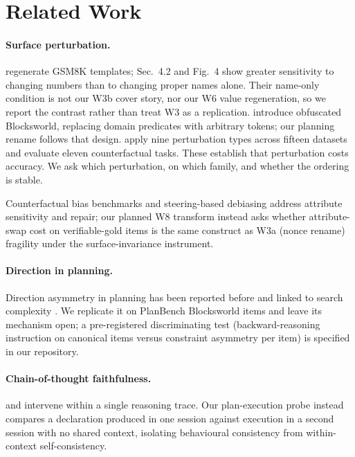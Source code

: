 \documentclass{article}
\begin{document}
\section{Related Work}

\paragraph{Surface perturbation.} \citet{mirzadeh2025gsmsymbolic} regenerate GSM8K
templates; Sec.~4.2 and Fig.~4 show greater sensitivity to changing numbers than
to changing proper names alone. Their name-only condition is not our W3b cover
story, nor our W6 value regeneration, so we report the contrast rather than treat
W3 as a replication.
\citet{valmeekam2023planbench} introduce obfuscated
Blocksworld, replacing domain predicates with arbitrary tokens; our planning rename
follows that design. \citet{wang2024rupbench} apply nine perturbation types across
fifteen datasets and \citet{wu2024reasoning} evaluate eleven counterfactual tasks.
These establish that perturbation costs accuracy. We ask which perturbation, on
which family, and whether the ordering is stable.

Counterfactual bias benchmarks \citep{parrish-etal-2022-bbq,sahoo-etal-2024-indibias} and
steering-based debiasing \citep{siddique2025shifting} address attribute sensitivity and
repair; our planned W8 transform instead asks whether attribute-swap cost on
verifiable-gold items is the same construct as W3a (nonce rename) fragility under the
surface-invariance instrument.

\paragraph{Direction in planning.}
Direction asymmetry in planning has been reported before and linked to search
complexity \citep{fwdbwd2024}. We replicate it on PlanBench Blocksworld items and
leave its mechanism open; a pre-registered discriminating test (backward-reasoning
instruction on canonical items versus constraint asymmetry per item) is specified in
our repository.

\paragraph{Chain-of-thought faithfulness.} \citet{turpin2023language} and
\citet{lanham2023measuring} intervene within a single reasoning trace. Our
plan-execution probe instead compares a declaration produced in one session against
execution in a second session with no shared context, isolating behavioural
consistency from within-context self-consistency.
\end{document}
